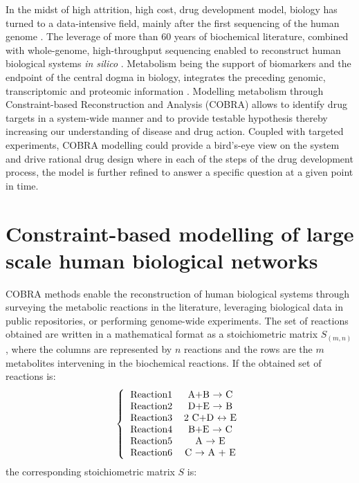 In the midst of high attrition, high cost, drug development model, biology has turned to a data-intensive field, mainly after the first sequencing of the human genome \cite{lander2001initial}. The leverage of more than 60 years of biochemical literature, combined with whole-genome, high-throughput sequencing enabled to reconstruct human biological systems \textit{in silico} \cite{duarte2007global,thiele2013community}. Metabolism being the support of biomarkers and the endpoint of the central dogma in biology, integrates the preceding genomic, transcriptomic and proteomic information \cite{mardinoglu2014genome,mardinoglu2013integration}. Modelling metabolism through Constraint-based Reconstruction and Analysis (COBRA) \cite{o2015using} allows to identify drug targets in a system-wide manner and to provide testable hypothesis thereby increasing our understanding of disease and drug action. Coupled with targeted experiments, COBRA modelling could provide a bird's-eye view on the system and drive rational drug design where in each of the steps of the drug development process, the model is further refined to answer a specific question at a given point in time.

\section{Constraint-based modelling of large scale human biological networks}
COBRA methods enable the reconstruction of human biological systems through surveying the metabolic reactions in the literature, leveraging biological data in public repositories, or performing genome-wide experiments. The set of reactions obtained are written in a mathematical format as a stoichiometric matrix $S_{(m,n)}$, where the columns are represented by $n$ reactions and the rows are the $m$ metabolites intervening in the biochemical reactions. If the obtained set of reactions is:   
\[ 
\left \{
  \begin{tabular}{ccc}
  Reaction1 & A+B $\rightarrow$ C  \\
  Reaction2 & D+E $\rightarrow$ B  \\
  Reaction3 & 2 C+D $\leftrightarrow$ E \\
  Reaction4 & B+E $\rightarrow$ C \\
  Reaction5 & A $\rightarrow$ E \\
  Reaction6 & C $\rightarrow$ A + E\\
  \end{tabular}
\right. 
\]
the corresponding stoichiometric matrix $S$ is:

